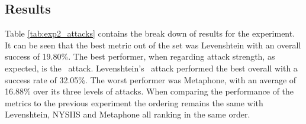 \subsection*{Results}
Table \ref{tab:exp2_attacks} contains the break down of results for the experiment. It can be seen that the best metric out of the set was Levenshtein with an overall success of 19.80\%. The best performer, when regarding attack strength, as expected, is the \XOOX~attack. Levenshtein's \XOOX~attack performed the best overall with a success rate of 32.05\%. The worst performer was Metaphone, with an average of 16.88\% over its three levels of attacks. When comparing the performance of the metrics to the previous experiment the ordering remains the same with Levenshtein, NYSIIS and Metaphone all ranking in the same order.

\begin{table}
    \caption{Success rates for simulated attacks}
    \label{tab:exp2_attacks}
\end{table}

